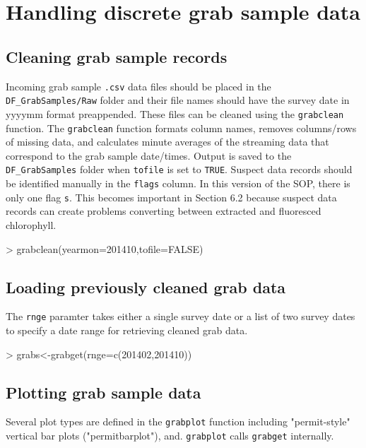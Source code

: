 \documentclass[12pt]{article}
\begin{document}
\section{Handling discrete grab sample data}
\subsection{Cleaning grab sample records}
Incoming grab sample \texttt{.csv} data files should be placed in the \verb|DF_GrabSamples/Raw| folder and their file names should have the survey date in yyyymm format preappended. These files can be cleaned using the \texttt{grabclean} function. The \texttt{grabclean} function formats column names, removes columns/rows of missing data, and calculates minute averages of the streaming data that correspond to the grab sample date/times. Output is saved to the \verb|DF_GrabSamples| folder when \texttt{tofile} is set to \texttt{TRUE}. Suspect data records should be identified manually in the \texttt{flags} column. In this version of the SOP, there is only one flag \texttt{s}. This becomes important in Section 6.2 because suspect data records can create problems converting between extracted and fluoresced chlorophyll.

\begin{Schunk}
\begin{Sinput}
> grabclean(yearmon=201410,tofile=FALSE)
\end{Sinput}
\end{Schunk}

\subsection{Loading previously cleaned grab data}

The \texttt{rnge} paramter takes either a single survey date or a list of two survey dates to specify a date range for retrieving cleaned grab data.

\begin{Schunk}
\begin{Sinput}
> grabs<-grabget(rnge=c(201402,201410))
\end{Sinput}
\end{Schunk}

\subsection{Plotting grab sample data}

Several plot types are defined in the \texttt{grabplot} function including "permit-style" vertical bar plots ("permitbarplot"), and. \texttt{grabplot} calls \texttt{grabget} internally.
\end{document}
